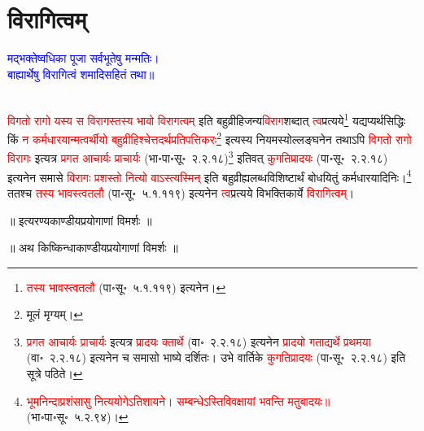 \section[विरागित्वम्]{विरागित्वम्}
\centering\textcolor{blue}{मद्भक्तेष्वधिका पूजा सर्वभूतेषु मन्मतिः।\nopagebreak\\
बाह्यार्थेषु विरागित्वं शमादिसहितं तथा॥}\nopagebreak\\
\\
\begin{sloppypar}\justifying\noindent\hspace{10mm} \textcolor{red}{विगतो रागो यस्य स विरागस्तस्य भावो विरागत्वम्} इति बहुव्रीहि\-जन्य\-\textcolor{red}{विराग}\-शब्दात् \textcolor{red}{त्व}\-प्रत्यये\footnote{\textcolor{red}{तस्य भावस्त्वतलौ} (पा॰सू॰~५.१.११९) इत्यनेन।} यद्यप्यर्थ\-सिद्धिः किं \textcolor{red}{न कर्मधारयान्मत्वर्थीयो बहुव्रीहिश्चेत्तदर्थ\-प्रतिपत्तिकरः}\footnote{मूलं मृग्यम्।} इत्यस्य नियमस्योल्लङ्घनेन तथाऽपि \textcolor{red}{विगतो रागो विरागः} इत्यत्र \textcolor{red}{प्रगत आचार्यः प्राचार्यः} (भा॰पा॰सू॰~२.२.१८)\footnote{\textcolor{red}{प्रगत आचार्यः प्राचार्यः} इत्यत्र \textcolor{red}{प्रादयः क्तार्थे} (वा॰~२.२.१८) इत्यनेन \textcolor{red}{प्रादयो गताद्यर्थे प्रथमया} (वा॰~२.२.१८) इत्यनेन च समासो भाष्ये दर्शितः। उभे वार्तिके \textcolor{red}{कु\-गति\-प्रादयः} (पा॰सू॰~२.२.१८) इति सूत्रे पठिते।} इतिवत् \textcolor{red}{कु\-गति\-प्रादयः} (पा॰सू॰~२.२.१८) इत्यनेन समासे \textcolor{red}{विरागः प्रशस्तो नित्यो वाऽस्त्यस्मिन्} इति बहुव्रीह्यलब्ध\-विशिष्टार्थं बोधयितुं कर्मधारयादिनिः।\footnote{\textcolor{red}{भूम\-निन्दा\-प्रशंसासु नित्ययोगेऽति\-शायने। सम्बन्धेऽस्ति\-विवक्षायां भवन्ति मतुबादयः॥} (भा॰पा॰सू॰~५.२.९४)।} ततश्च \textcolor{red}{तस्य भावस्त्वतलौ} (पा॰सू॰~५.१.११९) इत्यनेन \textcolor{red}{त्व}\-प्रत्यये विभक्ति\-कार्ये \textcolor{red}{विरागित्वम्}।\end{sloppypar}
\vspace{2mm}
\centering ॥ इत्यरण्यकाण्डीयप्रयोगाणां विमर्शः ॥\nopagebreak\\
\vspace{4mm}
{}
\centering ॥ अथ किष्किन्धाकाण्डीयप्रयोगाणां विमर्शः ॥\nopagebreak\\
